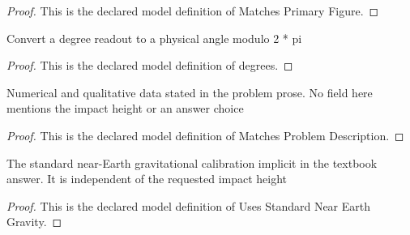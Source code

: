 \begin{proof}
  This is the declared model definition of Matches Primary Figure.
\end{proof}
\begin{definition}[degrees]
  \label{def:physics:phyx-mini-0740:phyxminiproblems-problemphyxmini0740-degrees}
  Convert a degree readout to a physical angle modulo 2 * pi
\end{definition}
\begin{proof}
  This is the declared model definition of degrees.
\end{proof}
\begin{definition}
  \label{def:physics:phyx-mini-0740:phyxminiproblems-problemphyxmini0740-matchesproblemdescription}
  Numerical and qualitative data stated in the problem prose. No field here mentions the impact height or an answer choice
\end{definition}
\begin{proof}
  This is the declared model definition of Matches Problem Description.
\end{proof}
\begin{definition}
  \label{def:physics:phyx-mini-0740:phyxminiproblems-problemphyxmini0740-usesstandardnearearthgravity}
  The standard near-Earth gravitational calibration implicit in the textbook answer. It is independent of the requested impact height
\end{definition}
\begin{proof}
  This is the declared model definition of Uses Standard Near Earth Gravity.
\end{proof}
